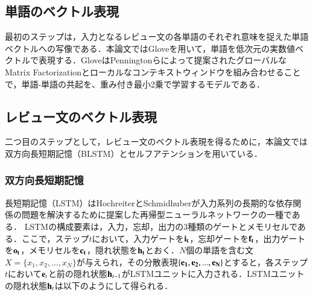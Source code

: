\documentclass[dvipdfmx,twocolumn,10.5pt]{jsarticle}
\begin{document}
\subsection{単語のベクトル表現}\label{suggestion_create}
最初のステップは，入力となるレビュー文の各単語のそれぞれ意味を捉えた単語ベクトルへの写像である．本論文ではGlove\cite{pennington2014glove}を用いて，単語を低次元の実数値ベクトルで表現する．GloveはPenningtonらによって提案されたグローバルなMatrix Factorizationとローカルなコンテキストウィンドウを組み合わせることで，単語-単語の共起を、重み付き最小2乗で学習するモデルである．

\subsection{レビュー文のベクトル表現}\label{suggestion_create}
二つ目のステップとして，レビュー文のベクトル表現を得るために，本論文では双方向長短期記憶（BLSTM）とセルフアテンションを用いている．
\subsubsection{双方向長短期記憶}
長短期記憶（LSTM）はHochreiterとSchmidhuberが入力系列の長期的な依存関係の問題を解決するために提案した再帰型ニューラルネットワークの一種である．\cite{hochreiter1997long}
LSTMの構成要素は，入力，忘却，出力の3種類のゲートとメモリセルである．ここで，ステップ$t$において，入力ゲートを$\bf{i}_t$，忘却ゲートを$\bf{f}_t$，出力ゲートを$\bf{o}_t$，メモリセルを$\bf{c}_t$，隠れ状態を$\bf{h}_t$とおく．$N$個の単語を含む文$X=\{ x_1, x_2, ..., x_N \}$が与えられ，その分散表現$\{\bf{e}_1, \bf{e}_2, ..., {\bf e}_N \}$とすると，各ステップ$t$において${\bf e}_t$と前の隠れ状態${\bf h}_{t-1}$がLSTMユニットに入力される．LSTMユニットの隠れ状態${\bf h}_t$は以下のようにして得られる．
\end{document}
